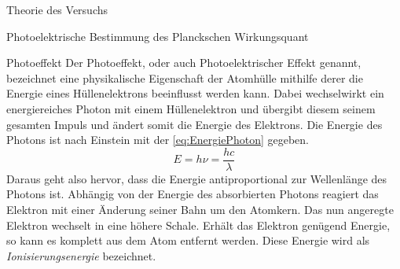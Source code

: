\documentclass[pdftex, a4paper,11pt, twoside, ngerman]{report}
\begin{document}
\begin{chapter}{Theorie des Versuchs}
\begin{section}{Photoelektrische Bestimmung des Planckschen Wirkungsquant}
      \begin{subsection}{Photoeffekt}
        \label{chp:TheoriePhotoelektrischesWirkungsquantumPhotoeffekt}
        Der Photoeffekt, oder auch Photoelektrischer Effekt genannt, bezeichnet
        eine physikalische Eigenschaft der Atomhülle mithilfe derer die
        Energie eines Hüllenelektrons beeinflusst werden kann. Dabei
        wechselwirkt ein energiereiches Photon mit einem Hüllenelektron und
        übergibt diesem seinem gesamten Impuls und ändert somit die Energie
        des Elektrons. Die Energie des Photons ist nach Einstein mit der
        \cref{eq:EnergiePhoton} gegeben.
        \begin{equation}
          \label{eq:EnergiePhoton}
          E=h\nu=\frac{hc}{\lambda}
        \end{equation}
        Daraus geht also hervor, dass die Energie antiproportional zur
        Wellenlänge des Photons ist. Abhängig von der Energie des absorbierten
        Photons reagiert das Elektron mit einer Änderung seiner Bahn um den
        Atomkern. Das nun angeregte Elektron wechselt in eine höhere Schale.
        Erhält das Elektron genügend Energie, so kann es komplett aus dem Atom
        entfernt werden. Diese Energie wird als \textit{Ionisierungsenergie}
        bezeichnet.
       
       

\end{subsection}
\end{section}
\end{chapter}
\end{document}
